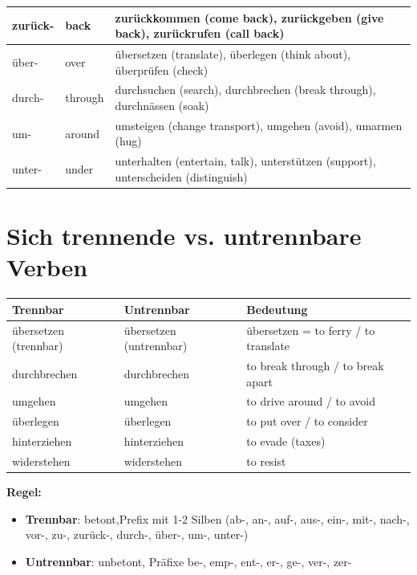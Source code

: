 \begin{center}
\begin{tabular}{|l|l|p{7cm}|}
zurück- & back & \begin{minipage}{7cm}zurückkommen (come back), zurückgeben (give back), zurückrufen (call back)\end{minipage} \\ \hline
über- & over & \begin{minipage}{7cm}übersetzen (translate), überlegen (think about), überprüfen (check)\end{minipage} \\ \hline
durch- & through & \begin{minipage}{7cm}durchsuchen (search), durchbrechen (break through), durchnässen (soak)\end{minipage} \\ \hline
um- & around & \begin{minipage}{7cm}umsteigen (change transport), umgehen (avoid), umarmen (hug)\end{minipage} \\ \hline
unter- & under & \begin{minipage}{7cm}unterhalten (entertain, talk), unterstützen (support), unterscheiden (distinguish)\end{minipage} \\ \hline
\end{tabular}
\end{center}

\section{Sich trennende vs. untrennbare Verben}
\label{sec:TrennVSU}

\bigskip
\begin{center}
\begin{tabular}{|l|l|l|}
\hline
Trennbar & Untrennbar & Bedeutung \\ \hline
übersetzen (trennbar) & übersetzen (untrennbar) & übersetzen = to ferry / to translate \\ \hline
durchbrechen & durchbrechen & to break through / to break apart \\ \hline
umgehen & umgehen & to drive around / to avoid \\ \hline
überlegen & überlegen & to put over / to consider \\ \hline
hinterziehen & hinterziehen & to evade (taxes) \\ \hline
widerstehen & widerstehen & to resist \\ \hline
\end{tabular}
\end{center}

\bigskip
\noindent\textbf{Regel:}
\begin{itemize}
    \item \textbf{Trennbar}: betont,Prefix mit 1-2 Silben (ab-, an-, auf-, aus-, ein-, mit-, nach-, vor-, zu-, zurück-, durch-, über-, um-, unter-)
    \item \textbf{Untrennbar}: unbetont, Präfixe be-, emp-, ent-, er-, ge-, ver-, zer-
\end{itemize}

\chapterend